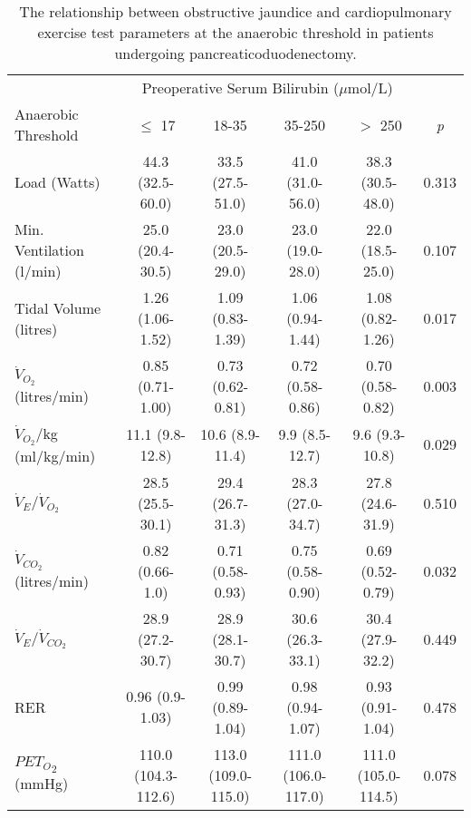 \begin{sidewaystable}[p]
	\caption{The relationship  between obstructive jaundice and cardiopulmonary exercise test parameters at the anaerobic threshold in patients undergoing pancreaticoduodenectomy.  }
	\label{table:cpet_oj_anaerobic}
	\centering
	\renewcommand{\arraystretch}{1.2} %
	\begin{tabular}{|l| c c c c c|}
		\hline
		                               &             \multicolumn{4}{c}{Preoperative Serum Bilirubin ($\mu$mol/L)}             &  \\
		Anaerobic Threshold            & $\leq$ 17           & 18-35               & 35-250              & $>$ 250             & \textit{p} \\ \hline
		Load  (Watts)                  & 44.3 (32.5-60.0)    & 33.5 (27.5-51.0)    & 41.0 (31.0-56.0)    & 38.3 (30.5-48.0)    & 0.313      \\
		Min. Ventilation (l/min)       & 25.0 (20.4-30.5)    & 23.0 (20.5-29.0)    & 23.0 (19.0-28.0)    & 22.0 (18.5-25.0)    & 0.107      \\
		Tidal Volume (litres)          & 1.26 (1.06-1.52)    & 1.09 (0.83-1.39)    & 1.06 (0.94-1.44)    & 1.08 (0.82-1.26)    & 0.017      \\
		$\dot{V}_{O_2}$ (litres/min)   & 0.85 (0.71-1.00)    & 0.73 (0.62-0.81)    & 0.72 (0.58-0.86)    & 0.70 (0.58-0.82)    & 0.003      \\
		$\dot{V}_{O_2}$/kg (ml/kg/min) & 11.1 (9.8-12.8)     & 10.6 (8.9-11.4)     & 9.9 (8.5-12.7)      & 9.6 (9.3-10.8)      & 0.029      \\
		$\dot{V}_E/\dot{V}_{O_2}$      & 28.5 (25.5-30.1)    & 29.4 (26.7-31.3)    & 28.3 (27.0-34.7)    & 27.8 (24.6-31.9)    & 0.510      \\
		$\dot{V}_{CO_2}$ (litres/min)  & 0.82 (0.66-1.0)     & 0.71 (0.58-0.93)    & 0.75 (0.58-0.90)    & 0.69 (0.52-0.79)    & 0.032      \\
		$\dot{V}_E/\dot{V}_{CO_2}$     & 28.9 (27.2-30.7)    & 28.9 (28.1-30.7)    & 30.6 (26.3-33.1)    & 30.4 (27.9-32.2)    & 0.449      \\
		RER                            & 0.96 (0.9-1.03)     & 0.99 (0.89-1.04)    & 0.98 (0.94-1.07)    & 0.93 (0.91-1.04)    & 0.478      \\
		${PET_O}_2$ (mmHg)             & 110.0 (104.3-112.6) & 113.0 (109.0-115.0) & 111.0 (106.0-117.0) & 111.0 (105.0-114.5) & 0.078      \\

\end{tabular}
\end{sidewaystable}
